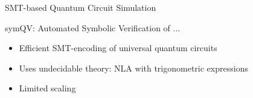 \begin{refframe}{SMT-based Quantum Circuit Simulation}

\vspace{-3em}



\begin{block}{symQV: Automated Symbolic Verification of ... \cite{bauermarquart2023symqv}}
\pause
\begin{itemize}
\item<+-> Efficient SMT-encoding of \alert{universal} quantum circuits
\item<3-> Uses \alert{undecidable} theory: NLA with trigonometric expressions
\item<3-> Limited scaling
\end{itemize}
\end{block}



	
\end{refframe}






